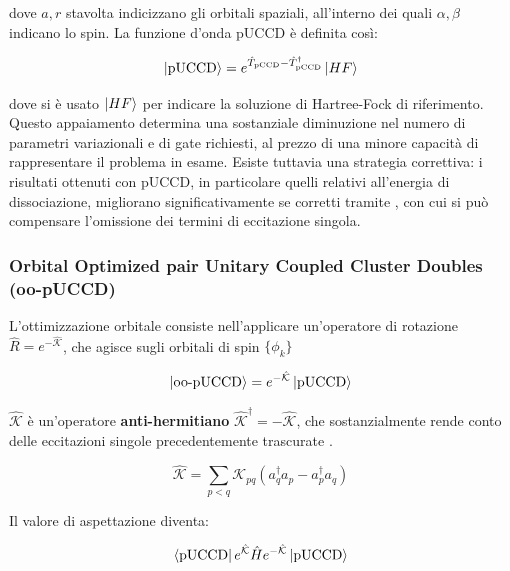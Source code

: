 dove $a,r$ stavolta indicizzano gli orbitali spaziali, all'interno dei quali $\alpha,\beta$ indicano lo spin. La funzione d'onda pUCCD è definita così:

\begin{equation}
    \ket{\text{pUCCD}} = e^{\hat{T}_{\text{pCCD}} - \hat{T}_{\text{pCCD}}^{\dagger}} \ket{HF}
\end{equation}

dove si è usato $\ket{HF}$ per indicare la soluzione di Hartree-Fock di riferimento. Questo appaiamento determina una sostanziale diminuzione nel numero di parametri variazionali e di gate richiesti, al prezzo di una minore capacità di rappresentare il problema in esame. Esiste tuttavia una strategia correttiva: i risultati ottenuti con pUCCD, in particolare quelli relativi all'energia di dissociazione, migliorano significativamente se corretti tramite , con cui si può compensare l'omissione dei termini di eccitazione singola. 

\subsubsection{Orbital Optimized pair Unitary Coupled Cluster Doubles (oo-pUCCD)}
L'ottimizzazione orbitale consiste nell'applicare un'operatore di rotazione $\hat{R}=e^{-\hat{\mathcal{K}}}$, che agisce sugli orbitali di spin $\{\phi_k\}$ \cite{Sokolov_2020,Zhao_2023}

\begin{equation}\label{eqn:ansatz-oo-pUCCD}
    \ket{\text{oo-pUCCD}} = e^{-\hat{\mathcal{K}}} \ket{\text{pUCCD}}
\end{equation}

$\hat{\mathcal{K}}$ è un'operatore \textbf{anti-hermitiano} $\hat{\mathcal{K}}^\dagger = - \hat{\mathcal{K}}$, che sostanzialmente rende conto delle eccitazioni singole precedentemente trascurate \cite{Mizukami_2020}. 

\begin{equation}\label{eqn:operatore-K}
    \hat{\mathcal{K}} = \sum_{p<q} \mathcal{K}_{pq} (a_{q}^{\dagger}a_{p} - a_{p}^{\dagger}a_{q})
\end{equation}

Il valore di aspettazione diventa:

\begin{equation}\label{eqn:energia-oo-pUCCD}
    \bra{\text{pUCCD}} e^{\hat{\mathcal{K}}} \hat{H} e^{-\hat{\mathcal{K}}} \ket{\text{pUCCD}} 
\end{equation}

